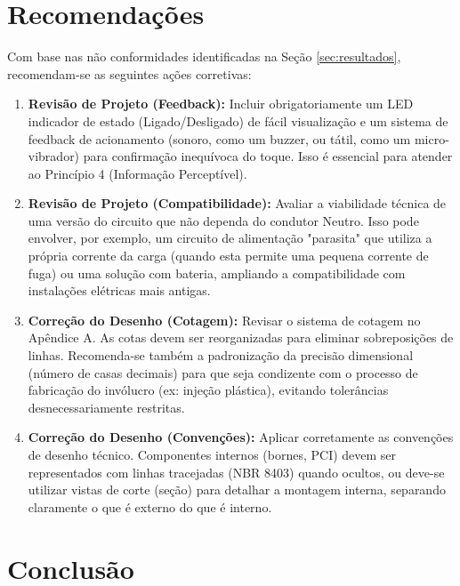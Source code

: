 \documentclass[12pt, openright, a4paper, openany, oneside, chapter=TITLE, section=TITLE, subsection=TITLE, subsubsection=TITLE, subsubsubsection=TITLE, subsubsubsection=TITLE, brazil]{abntex2}
\begin{document}
\chapter{Recomendações}
\label{sec:recomendacoes}

Com base nas não conformidades identificadas na Seção \ref{sec:resultados}, recomendam-se as seguintes ações corretivas:

\begin{enumerate}
    \item \textbf{Revisão de Projeto (Feedback):} Incluir obrigatoriamente um LED indicador de estado (Ligado/Desligado) de fácil visualização e um sistema de feedback de acionamento (sonoro, como um buzzer, ou tátil, como um micro-vibrador) para confirmação inequívoca do toque. Isso é essencial para atender ao Princípio 4 (Informação Perceptível).
    
    \item \textbf{Revisão de Projeto (Compatibilidade):} Avaliar a viabilidade técnica de uma versão do circuito que não dependa do condutor Neutro. Isso pode envolver, por exemplo, um circuito de alimentação "parasita" que utiliza a própria corrente da carga (quando esta permite uma pequena corrente de fuga) ou uma solução com bateria, ampliando a compatibilidade com instalações elétricas mais antigas.
    
    \item \textbf{Correção do Desenho (Cotagem):} Revisar o sistema de cotagem no Apêndice A. As cotas devem ser reorganizadas para eliminar sobreposições de linhas. Recomenda-se também a padronização da precisão dimensional (número de casas decimais) para que seja condizente com o processo de fabricação do invólucro (ex: injeção plástica), evitando tolerâncias desnecessariamente restritas.
    
    \item \textbf{Correção do Desenho (Convenções):} Aplicar corretamente as convenções de desenho técnico. Componentes internos (bornes, PCI) devem ser representados com linhas tracejadas (NBR 8403) quando ocultos, ou deve-se utilizar vistas de corte (seção) para detalhar a montagem interna, separando claramente o que é externo do que é interno.
\end{enumerate}


\chapter{Conclusão}
\label{sec:conclusao}
\end{document}
